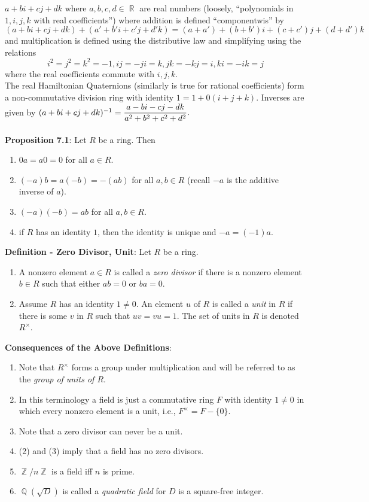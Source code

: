 \documentclass{article}
\DeclareMathOperator{\Z}{\mathbb{Z}}
\DeclareMathOperator{\Q}{\mathbb{Q}}
\DeclareMathOperator{\R}{\mathbb{R}}
\begin{document}
$a + bi + cj + dk$ where $a, b, c, d \in \R$ are real numbers (loosely, ``polynomials in $1, i, j, k$ with real coefficients'') where addition is defined ``componentwis'' by $$(a+bi+cj+dk) + (a' + b'i + c'j + d'k) = (a + a') + (b + b')i + (c + c')j + (d + d')k$$ and multiplication is defined using the distributive law and simplifying using the relations $$i^2 = j^2 = k^2 = -1, ij = -ji = k, jk = -kj = i, ki = -ik = j$$ where the real coefficients commute with $i, j, k.$ \\ The real Hamiltonian Quaternions (similarly is true for rational coefficients) form a non-commutative division ring with identity $1 = 1 + 0(i + j + k)$. Inverses are given by $(a + bi + cj + dk)^{-1} = \mathlarger{\frac{a - bi - cj - dk}{a^2 + b^2 + c^2 + d^2}}.$ \\ \\
\textbf{Proposition 7.1}: Let $R$ be a ring. Then \begin{enumerate}
    \item $0a = a0 = 0$ for all $a \in R$.
    \item $(-a)b = a(-b) = -(ab)$ for all $a, b \in R$ (recall $-a$ is the additive inverse of $a$).
    \item $(-a)(-b) = ab$ for all $a, b \in R$.
    \item if $R$ has an identity $1$, then the identity is unique and $-a = (-1)a$.
\end{enumerate} $ $ \\
\textbf{Definition - Zero Divisor, Unit}: Let $R$ be a ring. \begin{enumerate}
    \item A nonzero element $a \in R$ is called a \textit{zero divisor} if there is a nonzero element $b \in R$ such that either $ab = 0$ or $ba = 0$.
    \item Assume $R$ has an identity $1 \neq 0$. An element $u$ of $R$ is called a \textit{unit} in $R$ if there is some $v$ in $R$ such that $uv = vu = 1$. The set of units in $R$ is denoted $R^\times$. 
\end{enumerate} $ $ \\
\textbf{Consequences of the Above Definitions}: \begin{enumerate}
    \item Note that $R^\times$ forms a group under multiplication and will be referred to as the \textit{group of units of $R$}.
    \item In this terminology a field is just a commutative ring $F$ with identity $1 \neq 0$ in which every nonzero element is a unit, i.e., $F^\times = F - \{0\}$.
    \item Note that a zero divisor can never be a unit.
    \item (2) and (3) imply that a field has no zero divisors.
    \item $\Z/n\Z$ is a field iff $n$ is prime.
    \item $\Q(\sqrt{D})$ is called a \textit{quadratic field} for $D$ is a square-free integer.
\end{enumerate} $ $ \\
\end{document}
